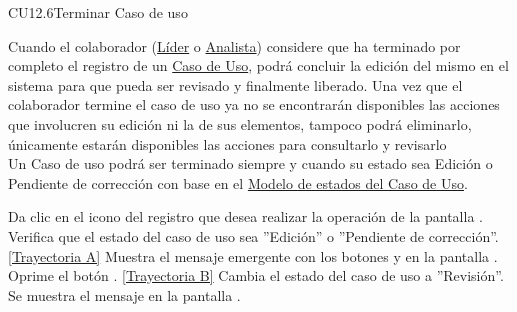 	\begin{UseCase}{CU12.6}{Terminar Caso de uso}{
			
			Cuando el colaborador (\hyperlink{jefe}{Líder} o \hyperlink{analista}{Analista}) considere que ha terminado por completo el registro de un \hyperlink{casoUso}{Caso de Uso}, podrá concluir la edición del mismo en el sistema para que pueda ser revisado y finalmente liberado.
			Una vez que el colaborador termine el caso de uso ya no se encontrarán disponibles las acciones que involucren su edición ni la de sus elementos, tampoco podrá eliminarlo, únicamente estarán disponibles las acciones para consultarlo y revisarlo \\
		
			Un Caso de uso podrá ser terminado siempre y cuando su estado sea Edición o Pendiente de corrección con base en el \hyperlink{edoCU}{Modelo de estados del Caso de Uso}. 
			
	}
	\end{UseCase}
	\begin{UCtrayectoria}
		\UCpaso[\UCactor] Da clic en el icono  del registro que desea realizar la operación de la pantalla .
		\UCpaso[\UCsist] Verifica que el estado del caso de uso sea ''Edición'' o ''Pendiente de corrección''. \hyperlink{CU12-5:TAA}{[Trayectoria A]}
		\UCpaso[\UCsist] Muestra el mensaje emergente  con los botones  y  en la pantalla .
		\UCpaso[\UCactor] Oprime el botón . \hyperlink{CU12-5:TAB}{[Trayectoria B]}
		\UCpaso[\UCsist] Cambia el estado del caso de uso a ''Revisión''.
		\UCpaso[\UCactor] Se muestra el mensaje  en la pantalla .
	\end{UCtrayectoria}		
